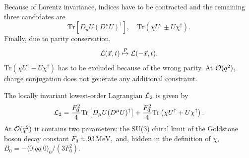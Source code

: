 \documentclass[twoside,12pt]{article}
\begin{document}
   Because of Lorentz invariance, indices have to be contracted and the remaining three
candidates are
\begin{displaymath}
\mbox{Tr}\left[D_{\mu} U (D^{\mu} U)^{\dagger} \right], \quad
\mbox{Tr}\left ( \chi U^{\dagger} \pm U \chi^{\dagger} \right ).
\end{displaymath}
   Finally, due to parity conservation,
\begin{displaymath}
{\cal L}(\vec{x},t)  \stackrel{P}{\mapsto}  {\cal L}(-\vec{x},t).
\end{displaymath}
$\mbox{Tr}(\chi U^\dagger-U\chi^\dagger)$ has to be excluded because of the wrong parity.
   At ${\cal O}(q^2)$, charge conjugation does not generate any additional constraint.

   The locally invariant lowest-order Lagrangian ${\cal L}_2$ is given by
\begin{equation}
\label{3:2:3:lol} {\cal L}_2 = \frac{F_0^2}{4} \mbox{Tr} \left[D_{\mu}
U (D^{\mu}U)^{\dagger} \right] +\frac{F_0^2}{4} \mbox{Tr} \left (
\chi U^{\dagger}+ U \chi^{\dagger} \right ).
\end{equation}
   At ${\cal O}(q^2)$ it contains two parameters: the SU(3) chiral limit of the Goldstone
boson decay constant $F_0\approx 93\, \mbox{MeV},$ and, hidden in the definition of
$\chi$, $ B_0=-\langle 0|\bar{q}{q}|0\rangle_0/(3 F^2_0)$.
\end{document}
